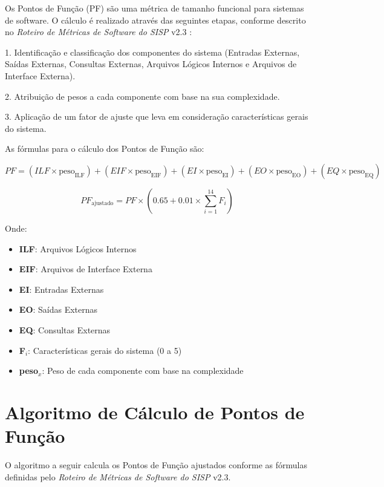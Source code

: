 \documentclass[12pt]{article}
\begin{document}
Os Pontos de Função (PF) são uma métrica de tamanho funcional para sistemas de software. O cálculo é realizado através das seguintes etapas, conforme descrito no \textit{Roteiro de Métricas de Software do SISP} v2.3 \cite{sisp}:

1. Identificação e classificação dos componentes do sistema (Entradas Externas, Saídas Externas, Consultas Externas, Arquivos Lógicos Internos e Arquivos de Interface Externa).

2. Atribuição de pesos a cada componente com base na sua complexidade.

3. Aplicação de um fator de ajuste que leva em consideração características gerais do sistema.

As fórmulas para o cálculo dos Pontos de Função são:

\begin{equation}
PF = (ILF \times \text{peso}_\text{ILF}) + (EIF \times \text{peso}_\text{EIF}) + (EI \times \text{peso}_\text{EI}) + (EO \times \text{peso}_\text{EO}) + (EQ \times \text{peso}_\text{EQ})
\end{equation}

\begin{equation}
PF_{\text{ajustado}} = PF \times (0.65 + 0.01 \times \sum_{i=1}^{14} F_i)
\end{equation}

Onde:
\begin{itemize}
    \item \textbf{ILF}: Arquivos Lógicos Internos
    \item \textbf{EIF}: Arquivos de Interface Externa
    \item \textbf{EI}: Entradas Externas
    \item \textbf{EO}: Saídas Externas
    \item \textbf{EQ}: Consultas Externas
    \item \textbf{F$_i$}: Características gerais do sistema (0 a 5)
    \item \textbf{peso$_x$}: Peso de cada componente com base na complexidade
\end{itemize}

\section{Algoritmo de Cálculo de Pontos de Função}

O algoritmo a seguir calcula os Pontos de Função ajustados conforme as fórmulas definidas pelo \textit{Roteiro de Métricas de Software do SISP} v2.3.
\end{document}

